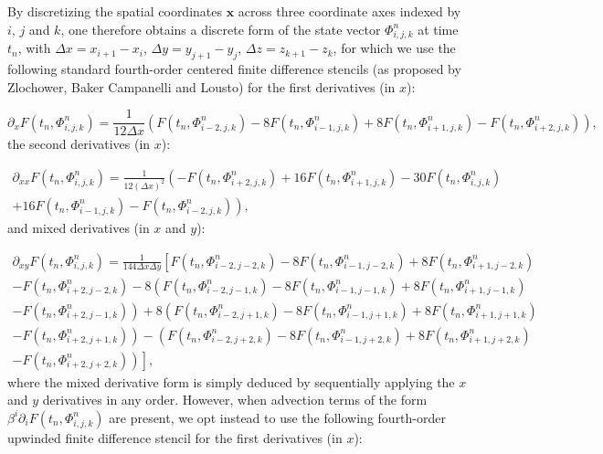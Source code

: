 \documentclass{article}
\begin{document}
By discretizing the spatial coordinates ${\mathbf{x}}$ across three coordinate axes indexed by $i$, $j$ and $k$, one therefore obtains a discrete form of the state vector ${\Phi_{i, j, k}^{n}}$ at time ${t_n}$, with ${\Delta x = x_{i + 1} - x_i}$, ${\Delta y = y_{j + 1} - y_j}$, ${\Delta z = z_{k + 1} - z_k}$, for which we use the following standard fourth-order centered finite difference stencils (as proposed by Zlochower, Baker Campanelli and Lousto\cite{zlochower}) for the first derivatives (in $x$):

\begin{equation}
\partial_x F \left( t_n, \Phi_{i, j, k}^{n} \right) = \frac{1}{12 \Delta x} \left( F \left( t_n, \Phi_{i - 2, j, k}^{n} \right) - 8 F \left( t_n, \Phi_{i - 1, j, k}^{n} \right) + 8 F \left( t_n, \Phi_{i + 1, j, k}^{n} \right) - F \left( t_n, \Phi_{i + 2, j, k}^{n} \right) \right),
\end{equation}
the second derivatives (in $x$):

\begin{multline}
\partial_{x x} F \left( t_n, \Phi_{i, j, k}^{n} \right) = \frac{1}{12 \left( \Delta x \right)^2} \left( - F \left( t_n, \Phi_{i + 2, j, k}^{n} \right) + 16 F \left( t_n, \Phi_{i + 1, j, k}^{n} \right) - 30 F \left( t_n, \Phi_{i, j, k}^{n} \right) \right.\\
\left. + 16 F \left( t_n, \Phi_{i - 1, j, k}^{n} \right) - F \left( t_n, \Phi_{i - 2, j, k}^{n} \right) \right),
\end{multline}
and mixed derivatives (in $x$ and $y$):

\begin{multline}
\partial_{x y} F \left( t_n, \Phi_{i, j, k}^{n} \right) = \frac{1}{144 \Delta x \Delta y} \left[ F \left( t_n, \Phi_{i - 2, j - 2, k}^{n} \right) - 8 F \left( t_n, \Phi_{i - 1, j - 2, k}^{n} \right) + 8 F \left( t_n, \Phi_{i + 1, j - 2, k}^{n} \right) \right.\\
\left. - F \left( t_n, \Phi_{i + 2, j - 2, k}^{n} \right) - 8 \left( F \left( t_n, \Phi_{i - 2, j - 1, k}^{n} \right) - 8 F \left( t_n, \Phi_{i - 1, j - 1, k}^{n} \right) + 8 F \left( t_n, \Phi_{i + 1, j - 1, k}^{n} \right) \right. \right.\\
\left. \left. - F \left( t_n, \Phi_{i + 2, j - 1, k}^{n} \right) \right) + 8 \left( F \left( t_n, \Phi_{i - 2, j + 1, k}^{n} \right) - 8 F \left( t_n, \Phi_{i - 1, j + 1, k}^{n} \right) + 8 F \left( t_n, \Phi_{i + 1, j + 1, k}^{n} \right) \right. \right.\\
\left. \left. - F \left( t_n, \Phi_{i + 2, j + 1, k}^{n} \right) \right) - \left( F \left( t_n, \Phi_{i - 2, j + 2, k}^{n} \right) - 8 F \left( t_n, \Phi_{i - 1, j + 2, k}^{n} \right) + 8 F \left( t_n, \Phi_{i + 1, j + 2, k}^{n} \right) \right. \right.\\
\left. \left. - F \left( t_n, \Phi_{i + 2, j + 2, k}^{n} \right) \right) \right],
\end{multline}
where the mixed derivative form is simply deduced by sequentially applying the $x$ and $y$ derivatives in any order. However, when advection terms of the form ${\beta^i \partial_i F \left( t_n, \Phi_{i, j, k}^{n} \right)}$ are present, we opt instead to use the following fourth-order upwinded finite difference stencil for the first derivatives (in $x$):
\end{document}
